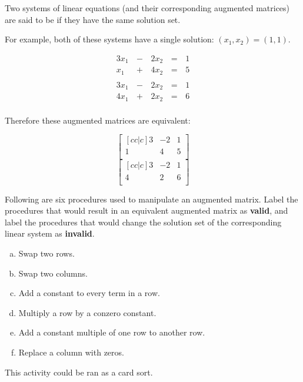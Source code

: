 \begin{applicationActivities}{1}{3}
\begin{definition}
  Two systems of linear equations (and their corresponding augmented
  matrices) are said to be  if they have the same
  solution set.

  For example, both of these systems have a single solution:
  \((x_1,x_2)=(1,1)\).

  \begin{multicols}{2}\noindent
    \begin{alignat*}{3}
      3x_1 &\,-\,& 2x_2 &\,=\,& 1 \\
      x_1 &\,+\,& 4x_2 &\,=\,& 5 \\
    \end{alignat*}
    \begin{alignat*}{3}
      3x_1 &\,-\,& 2x_2 &\,=\,& 1 \\
      4x_1 &\,+\,& 2x_2 &\,=\,& 6 \\
    \end{alignat*}
  \end{multicols}

  Therefore these augmented matrices are equivalent:

  \begin{multicols}{2}\noindent
    \[
      \begin{bmatrix}[cc|c]
        3 & -2 & 1\\
        1 &  4 & 5\\
      \end{bmatrix}
    \]
    \[
      \begin{bmatrix}[cc|c]
        3 & -2 & 1\\
        4 &  2 & 6\\
      \end{bmatrix}
    \]
  \end{multicols}
\end{definition}

\begin{activity}{15}
  Following are six procedures used to manipulate an augmented matrix.
  Label the procedures that would result in an equivalent augmented
  matrix as \textbf{valid}, and label the procedures that would
  change the solution set of the corresponding linear system as
  \textbf{invalid}.
  \begin{multicols}{2}
    \begin{enumerate}[a)]
      \item Swap two rows.
      \item Swap two columns.
      \item Add a constant to every term in a row.
      \item Multiply a row by a conzero constant.
      \item Add a constant multiple of one row to another row.
      \item Replace a column with zeros.
    \end{enumerate}
  \end{multicols}
  \begin{TBLnote}
    This activity could be ran as a card sort.
  \end{TBLnote}
\end{activity}

\end{applicationActivities}
